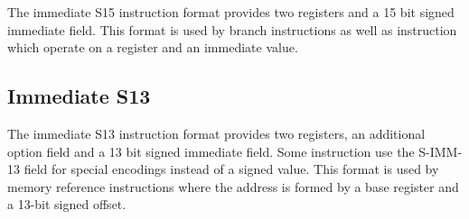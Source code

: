 The immediate S15 instruction format provides two registers and a 15 bit signed immediate field. This format is used by branch instructions as well as instruction which operate on a register and an immediate value.

\begin{center}
\end{center}

\subsection*{Immediate S13}

The immediate S13 instruction format provides two registers, an additional option field  and a 13 bit signed immediate field. Some instruction use the S-IMM-13 field for special encodings instead of a signed value. This format is used by memory reference instructions where the address is formed by a base register and a 13-bit signed offset.

